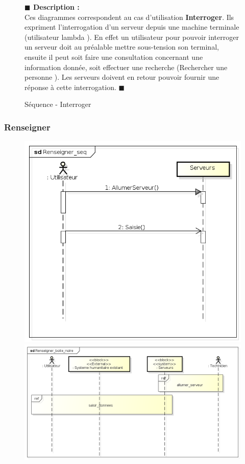 \documentclass[11pt, titlepage]{report}
\newcommand{\debutDescription}{\noindent\textbf{\textcolor{DescriptionColor}{$\blacksquare$  Description : \\}}}
\newcommand{\finDescription}{\noindent\textcolor{DescriptionColor}{$\blacksquare$}}
\begin{document}
\begin{figure}[h!]
\begin{center}
\caption{Séquence - Interroger}
\end{center}
\debutDescription
Ces diagrammes correspondent au cas d'utilisation \textbf{Interroger}. Ils expriment l'interrogation d'un serveur depuis une machine terminale (utilisateur lambda ). En effet un utilisateur pour pouvoir interroger un serveur doit au préalable mettre sous-tension son terminal, ensuite il peut soit faire une consultation concernant une information donnée, soit effectuer une recherche (Rechercher une personne ). Les serveurs doivent en retour pouvoir fournir une réponse à cette interrogation.
\finDescription
\end{figure}
\clearpage
\subsubsection{Renseigner}
\begin{figure}[h!]
\begin{center}
\includegraphics[scale=.4]{../images/diagrammes/sysml/sequence/renseigner.png} 
\includegraphics[scale=.4]{../images/diagrammes/sysml/sequence/renseigner_boite_noire.png} 

\end{center}
\end{figure}
\end{document}
